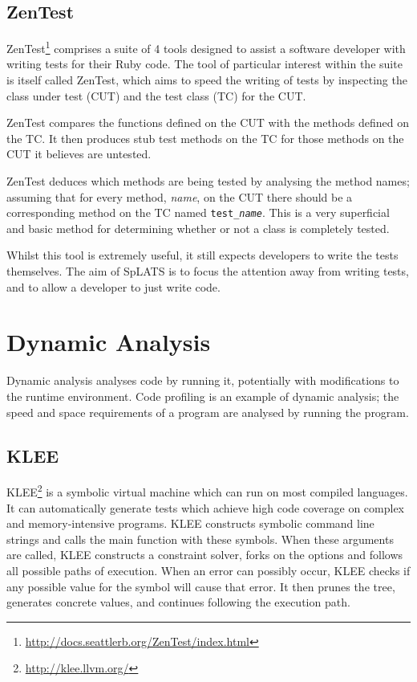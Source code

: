   \subsection{ZenTest}
    ZenTest\footnote{\url{http://docs.seattlerb.org/ZenTest/index.html}}
comprises a suite of 4 tools designed to assist a software developer with
writing tests for their Ruby code. The tool of particular interest within the suite is itself called ZenTest,
which aims to speed the writing of tests by inspecting the class under test (CUT)
and the test class (TC) for the CUT.

    ZenTest compares the functions defined on the CUT with the methods defined
on the TC. It then produces stub test methods on the TC for those methods on the
CUT it believes are untested.

ZenTest deduces which methods are being tested by analysing the method names; assuming that for every method, \emph{name}, on the CUT there should be a corresponding method on the TC named \texttt{test\_\emph{name}}. This is a very superficial and basic method for determining whether or not a class is completely tested.

    Whilst this tool is extremely useful, it still expects developers to write
the tests themselves. The aim of SpLATS is to focus the attention away from
writing tests, and to allow a developer to just write code.

\section{Dynamic Analysis} 

  Dynamic analysis analyses code by running it, potentially with modifications
  to the runtime environment. Code profiling is an example of dynamic analysis;
  the speed and space requirements of a program are analysed by running the
  program.
  
  \subsection{KLEE}
  KLEE\footnote{\url{http://klee.llvm.org/}} is a symbolic virtual machine which can run on most compiled languages. It can automatically generate tests which achieve high code coverage on complex and memory-intensive programs. KLEE constructs symbolic command line strings and calls the main function with these symbols. When these arguments are called, KLEE constructs a constraint solver, forks on the options and follows all possible paths of execution. When an error can possibly occur, KLEE checks if any possible value for the symbol will cause that error. It then prunes the tree, generates concrete values, and continues following the execution path\cite{klee_paper}.

